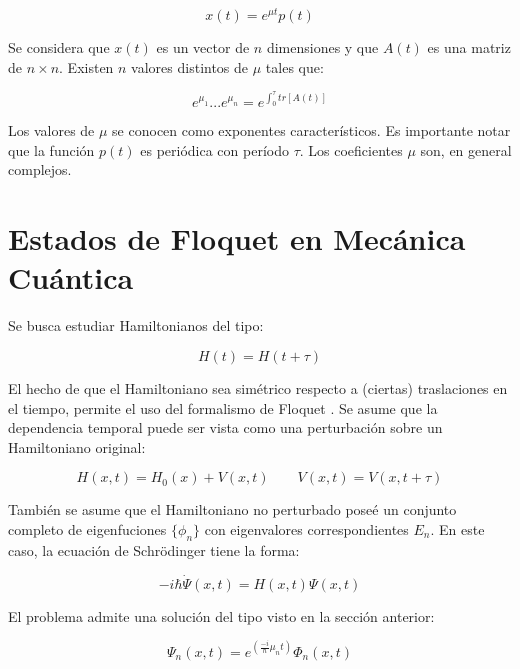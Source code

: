 \documentclass[a4paper,10pt]{report}
\begin{document}
\begin{equation}\label{FloquetForm}
x(t)=e^{\mu t}p(t)
\end{equation}

Se considera que $x(t)$ es un vector de $n$ dimensiones y que $A(t)$ es una matriz de $n\times n$. Existen $n$ valores distintos de $\mu$ tales que:

\begin{equation}
e^{\mu_1 }...e^{\mu_n}=e^{\int_0^\tau tr[A(t)]}
\end{equation}

Los valores de $\mu$ se conocen como exponentes característicos. Es importante notar que la función $p(t)$ es periódica con período $\tau$. Los coeficientes $\mu$ son, en general complejos.

\section{Estados de Floquet en Mecánica Cuántica}

Se busca estudiar Hamiltonianos del tipo:

\begin{equation}
H(t)=H(t+\tau)
\end{equation}

El hecho de que el Hamiltoniano sea simétrico respecto a (ciertas) traslaciones en el tiempo, permite el uso del formalismo de Floquet \cite{HanngiDQS}. Se asume que la dependencia temporal puede ser vista como una perturbación sobre un Hamiltoniano original:

\begin{equation}
H(x,t)=H_0(x)+V(x,t) \qquad V(x,t)=V(x,t+\tau)
\end{equation} 

También se asume que el Hamiltoniano no perturbado poseé un conjunto completo de eigenfuciones $\{\phi_n\}$ con eigenvalores correspondientes $E_n$. En este caso, la ecuación de Schr\"{o}dinger tiene la forma:

\begin{equation}\label{SchrodingerEQ}
-i\hbar\dot{\Psi}(x,t) = H(x,t)\Psi(x,t)
\end{equation}

El problema admite una solución del tipo visto en la sección anterior:

\begin{equation}
\Psi_n(x,t) = e^{(\frac{-i}{\hbar}\mu_nt)}\Phi_n(x,t)
\end{equation}
\end{document}
